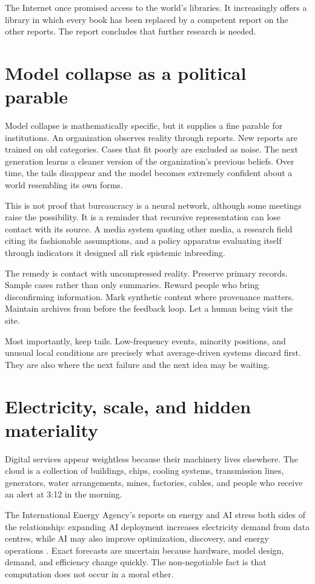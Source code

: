 \documentclass[12pt,a4paper]{book}
\begin{document}
The Internet once promised access to the world's libraries.  It increasingly
offers a library in which every book has been replaced by a competent report
on the other reports.  The report concludes that further research is needed.

\section{Model collapse as a political parable}

Model collapse is mathematically specific, but it supplies a fine parable for
institutions.  An organization observes reality through reports.  New reports
are trained on old categories.  Cases that fit poorly are excluded as noise.
The next generation learns a cleaner version of the organization's previous
beliefs.  Over time, the tails disappear and the model becomes extremely
confident about a world resembling its own forms.

This is not proof that bureaucracy is a neural network, although some meetings
raise the possibility.  It is a reminder that recursive representation can
lose contact with its source.  A media system quoting other media, a research
field citing its fashionable assumptions, and a policy apparatus evaluating
itself through indicators it designed all risk epistemic inbreeding.

The remedy is contact with uncompressed reality.  Preserve primary records.
Sample cases rather than only summaries.  Reward people who bring disconfirming
information.  Mark synthetic content where provenance matters.  Maintain
archives from before the feedback loop.  Let a human being visit the site.

Most importantly, keep tails.  Low-frequency events, minority positions, and
unusual local conditions are precisely what average-driven systems discard
first.  They are also where the next failure and the next idea may be waiting.

\section{Electricity, scale, and hidden materiality}

Digital services appear weightless because their machinery lives elsewhere.
The cloud is a collection of buildings, chips, cooling systems, transmission
lines, generators, water arrangements, mines, factories, cables, and people
who receive an alert at 3:12 in the morning.

The International Energy Agency's reports on energy and AI stress both sides
of the relationship: expanding AI deployment increases electricity demand from
data centres, while AI may also improve optimization, discovery, and energy
operations \cite{IEAEnergyAI2025,IEAKeyQuestionsAI2026}.  Exact forecasts are
uncertain because hardware, model design, demand, and efficiency change
quickly.  The non-negotiable fact is that computation does not occur in a moral
ether.
\end{document}
